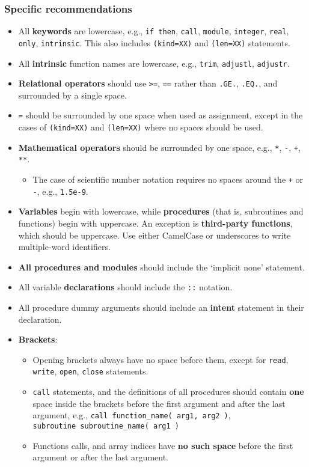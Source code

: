 \subsubsection{Specific
  recommendations} \label{specific-recommendations}

\begin{itemize}
\item All \textbf{keywords} are lowercase, e.g., \texttt{if\ then},
  \texttt{call}, \texttt{module}, \texttt{integer}, \texttt{real},
  \texttt{only}, \texttt{intrinsic}. This also includes
  \texttt{(kind=XX)} and \texttt{(len=XX)} statements.
\item All \textbf{intrinsic} function names are lowercase, e.g.,
  \texttt{trim}, \texttt{adjustl}, \texttt{adjustr}.
\item \textbf{Relational operators} should use
  \texttt{\textgreater{}=}, \texttt{==} rather than \texttt{.GE.},
  \texttt{.EQ.}, and surrounded by a single space.
\item \texttt{=} should be surrounded by one space when used as
  assignment, except in the cases of \texttt{(kind=XX)} and
  \texttt{(len=XX)} where no spaces should be used.
\item \textbf{Mathematical operators} should be surrounded by one
  space, e.g., \texttt{*}, \texttt{-}, \texttt{+}, \texttt{**}.
  \begin{itemize}
  \item The case of scientific number notation requires no spaces
    around the \texttt{+} or \texttt{-}, e.g., \texttt{1.5e-9}.
  \end{itemize}
\item \textbf{Variables} begin with lowercase, while
  \textbf{procedures} (that is, subroutines and functions) begin with
  uppercase. An exception is \textbf{third-party functions}, which
  should be uppercase. Use either CamelCase or underscores to write
  multiple-word identifiers.
\item \textbf{All procedures and modules} should include the `implicit
  none' statement.
\item All variable \textbf{declarations} should include the
  \texttt{::} notation.
\item All procedure dummy arguments should include an \textbf{intent}
  statement in their declaration.
\item \textbf{Brackets}:
  \begin{itemize}
  \item Opening brackets always have no space before them, except for
    \texttt{read}, \texttt{write}, \texttt{open}, \texttt{close}
    statements.
  \item \texttt{call} statements, and the definitions of all
    procedures should contain \textbf{one} space inside the brackets
    before the first argument and after the last argument, e.g.,
    \texttt{call\ function\_name(\ arg1,\ arg2\ )},
    \texttt{subroutine\ subroutine\_name(\ arg1\ )}
  \item Functions calls, and array indices have \textbf{no such space}
    before the first argument or after the last argument.
  \end{itemize}
\end{itemize}
